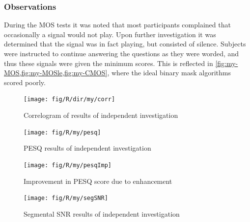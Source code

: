 \subsubsection*{Observations}

During the \ac{MOS} tests it was noted that most participants complained
that occasionally a signal would not play. Upon further investigation
it was determined that the signal was in fact playing, but consisted
of silence. Subjects were instructed to continue answering the questions
as they were worded, and thus these signals were given the minimum
scores. This is reflected in \cref{fig:my-MOS,fig:my-MOSle,fig:my-CMOS},
where the ideal binary mask algorithms scored poorly.

\begin{figure}[h]
\noindent \begin{centering}
\texttt{[image: fig/R/dir/my/corr]}
\par\end{centering}

\protect\caption{\label{fig:my-Corr}Correlogram of results of independent investigation}
\end{figure}


\begin{figure}[p]
\noindent \begin{centering}
\texttt{[image: fig/R/my/pesq]}
\par\end{centering}

\protect\caption{\label{fig:my-PESQ}\acs{PESQ} results of independent investigation}
\end{figure}


\begin{figure}[p]
\noindent \begin{centering}
\texttt{[image: fig/R/my/pesqImp]}
\par\end{centering}

\protect\caption{\label{fig:my-PESQ-imp}Improvement in \acs{PESQ} score due to enhancement}
\end{figure}


\begin{figure}[h]
\noindent \begin{centering}
\texttt{[image: fig/R/my/segSNR]}
\par\end{centering}

\protect\caption{\label{fig:my-segSNR}Segmental \acs{SNR} results of independent
investigation}
\end{figure}


